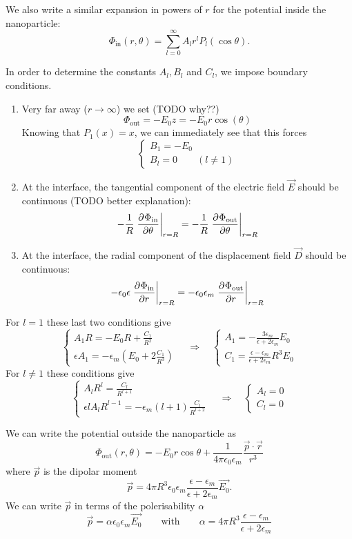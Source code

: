 We also write a similar expansion in powers of $r$ for the potential inside the nanoparticle:
\[ \Phi_\text{in}(r,\theta) = \sum^\infty_{l=0} A_l r^l P_l(\cos\theta). \]

In order to determine the constants $A_l, B_l$ and $C_l$, we impose boundary conditions.
\begin{enumerate}
\item Very far away ($r\to \infty$) we set (TODO why??)
\[ \Phi_\text{out} = -E_0 z = -E_0 r \cos(\theta)\]
Knowing that $P_1(x) = x$, we can immediately see that this forces
\[ \begin{cases}
B_1 = -E_0 \\
B_l = 0 \qquad (l \neq 1)
\end{cases} \]
\item At the interface, the tangential component of the electric field $\vec{E}$ should be continuous (TODO better explanation):
\[ - \frac{1}{R}\left. \frac{\partial{^{}}\Phi_\text{in}}{\partial{{\theta}^{}}} \right|_{r=R} = - \frac{1}{R}\left. \frac{\partial{^{}}\Phi_\text{out}}{\partial{{\theta}^{}}} \right|_{r=R} \]
\item At the interface, the radial component of the displacement field $\vec{D}$ should be continuous:
\[ - \epsilon_0\epsilon\left. \frac{\partial{^{}}\Phi_\text{in}}{\partial{{r}^{}}} \right|_{r=R} = - \epsilon_0\epsilon_m\left. \frac{\partial{^{}}\Phi_\text{out}}{\partial{{r}^{}}} \right|_{r=R} \]
\end{enumerate}
For $l=1$ these last two conditions give
\[ \begin{cases}
A_1 R = - E_0 R + \frac{C_1}{R^2} \\
\epsilon A_1 = - \epsilon_m \left(E_0 + 2 \frac{C_1}{R^3}\right)
\end{cases} \quad \Rightarrow \quad \begin{cases}
A_1 = - \frac{3\epsilon_m}{\epsilon + 2\epsilon_m}E_0 \\
C_1 = \frac{\epsilon - \epsilon_m}{\epsilon + 2\epsilon_m}R^3 E_0
\end{cases}\] 
For $l\neq 1$ these conditions give
\[ \begin{cases}
A_lR^l = \frac{C_l}{R^{l+1}} \\
\epsilon l A_lR^{l-1} = - \epsilon_m(l+1)\frac{C_l}{R^{l+2}}
\end{cases} \quad \Rightarrow \quad \begin{cases}
A_l = 0 \\
C_l = 0
\end{cases} \]

We can write the potential outside the nanoparticle as
\[ \Phi_\text{out}(r,\theta) = - E_0r\cos\theta + \frac{1}{4\pi\epsilon_0\epsilon_m}\frac{\vec{p}\cdot\vec{r}}{r^3} \]
where $\vec{p}$ is the dipolar moment
\[ \vec{p} = 4\pi R^3 \epsilon_0\epsilon_m \frac{\epsilon - \epsilon_m}{\epsilon + 2\epsilon_m}\vec{E_0}. \]
We can write $\vec{p}$ in terms of the polerisability $\alpha$
\[ \vec{p} = \alpha \epsilon_0\epsilon_m \vec{E_0} \qquad\text{with}\qquad \alpha = 4\pi R^3 \frac{\epsilon - \epsilon_m}{\epsilon + 2\epsilon_m} \]

